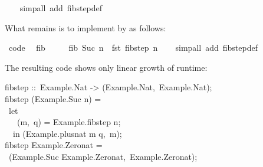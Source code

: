 \begin{isabellebody}
\ \ \isamarkupfalse%
\ {\isacharparenleft}simp{\isacharunderscore}all\ add{\isacharcolon}\ fib{\isacharunderscore}step{\isacharunderscore}def{\isacharparenright}%
\endisatagquote
{\isafoldquote}%
%
\isadelimquote
%
\endisadelimquote
%
\begin{isamarkuptext}%
\noindent What remains is to implement  by  as follows:%
\end{isamarkuptext}%
\isamarkuptrue%
%
\isadelimquote
%
\endisadelimquote
%
\isatagquote
{}\isamarkupfalse%
\ {\isacharbrackleft}code{\isacharbrackright}{\isacharcolon}\isanewline
\ \ {\isachardoublequoteopen}fib\ {}\ {\isacharequal}\ {}{\isachardoublequoteclose}\isanewline
\ \ {\isachardoublequoteopen}fib\ {\isacharparenleft}Suc\ n{\isacharparenright}\ {\isacharequal}\ fst\ {\isacharparenleft}fib{\isacharunderscore}step\ n{\isacharparenright}{\isachardoublequoteclose}\isanewline
\ \ \isamarkupfalse%
\ {\isacharparenleft}simp{\isacharunderscore}all\ add{\isacharcolon}\ fib{\isacharunderscore}step{\isacharunderscore}def{\isacharparenright}%
\endisatagquote
{\isafoldquote}%
%
\isadelimquote
%
\endisadelimquote
%
\begin{isamarkuptext}%
\noindent The resulting code shows only linear growth of runtime:%
\end{isamarkuptext}%
\isamarkuptrue%
%
\isadelimquote
%
\endisadelimquote
%
\isatagquote
%
\begin{isamarkuptext}%
\isatypewriter%
\noindent%
\hspace*{0pt}fib{}step ::~Example.Nat -> (Example.Nat,~Example.Nat);\\
\hspace*{0pt}fib{}step (Example.Suc n) =\\
\hspace*{0pt} ~let {}\\
\hspace*{0pt} ~~~(m,~q) = Example.fib{}step n;\\
\hspace*{0pt} ~{}~in (Example.plus{}nat m q,~m);\\
\hspace*{0pt}fib{}step Example.Zero{}nat =\\
\hspace*{0pt} ~(Example.Suc Example.Zero{}nat,~Example.Zero{}nat);\\
\hspace*{0pt}\\

\end{isamarkuptext}
\end{isabellebody}
